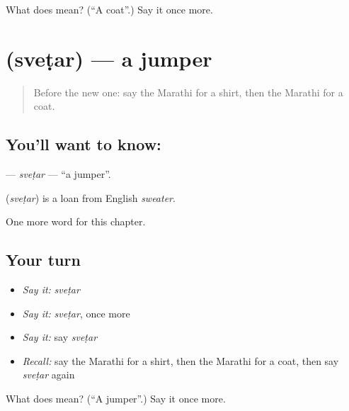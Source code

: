 \begin{tcolorbox}[breakable,colback=teal!4,colframe=teal!35!black,title={Before you move on}]
What does  mean? (\textquotedblleft{}A coat\textquotedblright{}.) Say it once more.
\end{tcolorbox}
\section[\texorpdfstring{\mr{स्वेटर} (sveṭar)}{स्वेटर (sveṭar)}]{ (sveṭar) — a jumper}

\label{lesson:MR-C136-svetar}



\begin{quote}
Before the new one: say the Marathi for a shirt, then the Marathi for a coat.
\end{quote}

\subsection*{You'll want to know: }
\textbf{} — \emph{sveṭar} — \textquotedblleft{}a jumper\textquotedblright{}.

\begin{cousinweb}
\textbf{} (\emph{sveṭar}) is a loan from English \emph{sweater}.
\end{cousinweb}

\begin{grammarlens}[title={What you've built}]
One more word for this chapter.
\end{grammarlens}

\subsection*{Your turn}
\begin{itemize}
\raggedright
  \item \emph{Say it:} \emph{sveṭar}
  \item \emph{Say it:} \emph{sveṭar}, once more
  \item \emph{Say it:} say \emph{sveṭar}
  \item \emph{Recall:} say the Marathi for a shirt, then the Marathi for a coat, then say \emph{sveṭar} again
\end{itemize}

\begin{tcolorbox}[breakable,colback=teal!4,colframe=teal!35!black,title={Before you move on}]
What does  mean? (\textquotedblleft{}A jumper\textquotedblright{}.) Say it once more.
\end{tcolorbox}
